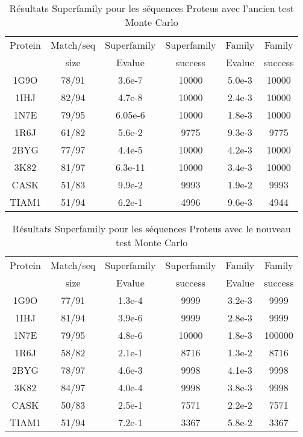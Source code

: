     \begin{table}[h]
           \raggedleft{}

      \begin{tabular}{cccccc}

        \toprule
        Protein & Match/seq & Superfamily & Superfamily & Family & Family \\
                & size      & Evalue      & success     & Evalue & success\\
        \cmidrule{1-6}
        1G9O  & 78/91 & 3.6e-7  &  10000 & 5.0e-3  & 10000 \\
        1IHJ  & 82/94 & 4.7e-8  &  10000 & 2.4e-3  & 10000 \\
        1N7E  & 79/95 & 6.05e-6 &  10000 & 1.8e-3  & 10000 \\
        1R6J  & 61/82 & 5.6e-2  &   9775 & 9.3e-3  &  9775 \\
        2BYG  & 77/97 & 4.4e-5  &  10000 & 4.2e-3  & 10000 \\
        3K82  & 81/97 & 6.3e-11 &  10000 & 3.4e-3  & 10000 \\
        CASK  & 51/83 & 9.9e-2  &   9993 & 1.9e-2  &  9993 \\
        TIAM1 & 51/94 & 6.2e-1  &   4996 & 9.6e-3  &  4944 \\
        \bottomrule        
      \end{tabular}   
     \caption{Résultats Superfamily pour les séquences Proteus avec l'ancien test Monte Carlo}   
\label{tab:superfamily_Old_MCtest}       
\end{table}



    \begin{table}[h]
           \raggedleft{}

      \begin{tabular}{cccccc}

        \toprule
        Protein & Match/seq & Superfamily & Superfamily & Family & Family \\
                & size      & Evalue      & success     & Evalue & success\\
        \cmidrule{1-6}
        1G9O  & 77/91 & 1.3e-4  &  9999 & 3.2e-3 &  9999  \\
        1IHJ  & 81/94 & 3.9e-6  &  9999 & 2.8e-3 &  9999  \\
        1N7E  & 79/95 & 4.8e-6  & 10000 & 1.8e-3 & 100000 \\
        1R6J  & 58/82 & 2.1e-1  &  8716 & 1.3e-2 &  8716  \\
        2BYG  & 78/97 & 4.6e-3  &  9998 & 4.1e-3 &  9998  \\
        3K82  & 84/97 & 4.0e-4  &  9998 & 3.8e-3 &  9998  \\
        CASK  & 50/83 & 2.5e-1  &  7571 & 2.2e-2 &  7571  \\
        TIAM1 & 51/94 & 7.2e-1  &  3367 & 5.8e-2 &  3367  \\
        \bottomrule        
      \end{tabular}   
     \caption{Résultats Superfamily pour les séquences Proteus avec le nouveau test Monte Carlo}   
\label{tab:superfamily_Old_MCtest}       
\end{table}



